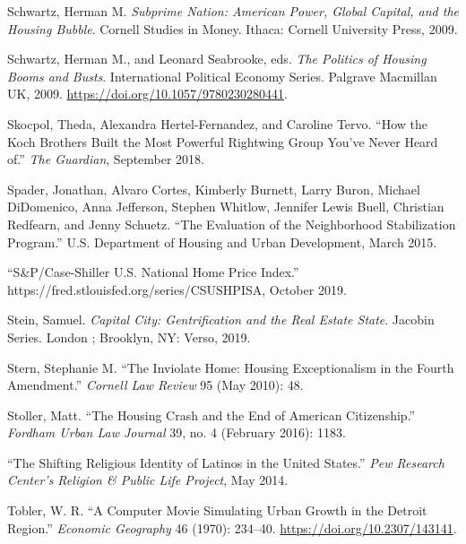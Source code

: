 \documentclass[12pt,oneside]{psthesis}
\begin{document}
\leavevmode\hypertarget{ref-schwartz2009subprime}{}%
Schwartz, Herman M. \emph{Subprime Nation: American Power, Global Capital, and the Housing Bubble}. Cornell Studies in Money. Ithaca: Cornell University Press, 2009.

\leavevmode\hypertarget{ref-schwartz2009politics}{}%
Schwartz, Herman M., and Leonard Seabrooke, eds. \emph{The Politics of Housing Booms and Busts}. International Political Economy Series. Palgrave Macmillan UK, 2009. \url{https://doi.org/10.1057/9780230280441}.

\leavevmode\hypertarget{ref-skocpol2018how}{}%
Skocpol, Theda, Alexandra Hertel-Fernandez, and Caroline Tervo. ``How the Koch Brothers Built the Most Powerful Rightwing Group You've Never Heard of.'' \emph{The Guardian}, September 2018.

\leavevmode\hypertarget{ref-spader2015evaluation}{}%
Spader, Jonathan, Alvaro Cortes, Kimberly Burnett, Larry Buron, Michael DiDomenico, Anna Jefferson, Stephen Whitlow, Jennifer Lewis Buell, Christian Redfearn, and Jenny Schuetz. ``The Evaluation of the Neighborhood Stabilization Program.'' U.S. Department of Housing and Urban Development, March 2015.

\leavevmode\hypertarget{ref-2019caseshiller}{}%
``S\&P/Case-Shiller U.S. National Home Price Index.'' https://fred.stlouisfed.org/series/CSUSHPISA, October 2019.

\leavevmode\hypertarget{ref-stein2019capital}{}%
Stein, Samuel. \emph{Capital City: Gentrification and the Real Estate State}. Jacobin Series. London ; Brooklyn, NY: Verso, 2019.

\leavevmode\hypertarget{ref-stern2010inviolate}{}%
Stern, Stephanie M. ``The Inviolate Home: Housing Exceptionalism in the Fourth Amendment.'' \emph{Cornell Law Review} 95 (May 2010): 48.

\leavevmode\hypertarget{ref-stollerHousingCrashEnd2016}{}%
Stoller, Matt. ``The Housing Crash and the End of American Citizenship.'' \emph{Fordham Urban Law Journal} 39, no. 4 (February 2016): 1183.

\leavevmode\hypertarget{ref-2014shifting}{}%
``The Shifting Religious Identity of Latinos in the United States.'' \emph{Pew Research Center's Religion \& Public Life Project}, May 2014.

\leavevmode\hypertarget{ref-tobler1970computer}{}%
Tobler, W. R. ``A Computer Movie Simulating Urban Growth in the Detroit Region.'' \emph{Economic Geography} 46 (1970): 234--40. \url{https://doi.org/10.2307/143141}.
\end{document}
